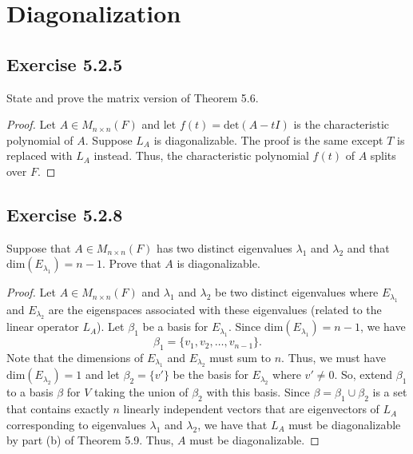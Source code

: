 \section{Diagonalization}

\subsection*{Exercise 5.2.5} State and prove the matrix version of Theorem 5.6.
\begin{proof}
Let \( A \in {M}_{n \times n}(F) \) and let \( f(t) = \text{det}(A - tI) \) is the characteristic polynomial of \( A \). Suppose \( {L}_{A} \) is diagonalizable. The proof is the same except \( T  \) is replaced with \( {L}_{A} \) instead. Thus, the characteristic polynomial \( f(t)  \) of \( A  \) splits over \( F  \).
\end{proof}

\subsection*{Exercise 5.2.8} Suppose that \( A \in {M}_{n \times n }(F) \) has two distinct eigenvalues \( {\lambda}_{1} \) and \( {\lambda}_{2} \) and that \( \text{dim}({E}_{{\lambda}_{1}}) = n - 1  \). Prove that \( A  \) is diagonalizable.
\begin{proof}
    Let \( A \in {M}_{n \times n}(F) \) and \( {\lambda}_{1} \) and \( {\lambda}_{2} \) be two distinct eigenvalues where \( {E}_{{\lambda}_{1}} \) and \( {E}_{{\lambda}_{2}} \) are the eigenspaces associated with these eigenvalues (related to the linear operator \( {L}_{A} \)). Let \( \beta_{1} \) be a basis for \( {E}_{\lambda_{1}} \). Since \( \text{dim}({E}_{\lambda_{1}}) = n - 1  \), we have
    \[  {\beta}_{1} = \{ {v}_{1}, {v}_{2}, \dots, {v}_{n-1} \}.   \]
    Note that the dimensions of \( {E}_{{\lambda}_{1}} \) and \( {E}_{{\lambda}_{2}}  \) must sum to \( n \). Thus, we must have \( \text{dim}({E}_{{\lambda}_{2}}) = 1  \) and let \( {\beta}_{2} = \{ v'  \}  \) be the basis for \( {E}_{{\lambda}_{2}} \) where \( v' \neq 0  \). So, extend \( {\beta}_{1} \) to a basis \( \beta  \) for \( V  \) taking the union of \(  {\beta}_{2}   \) with this basis. Since \( \beta = {\beta}_{1} \cup {\beta}_{2} \) is a set that contains exactly \( n  \) linearly independent vectors that are eigenvectors of \( {L}_{A} \) corresponding to eigenvalues \( {\lambda}_{1} \) and \( {\lambda}_{2} \), we have that \( {L}_{A} \) must be diagonalizable by part (b) of Theorem 5.9. Thus, \( A  \) must be diagonalizable.
\end{proof}

